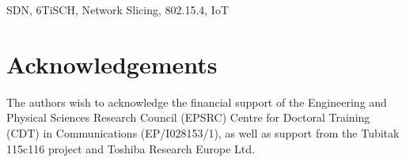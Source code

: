 \documentclass[conference]{IEEEtran}
\begin{document}
\begin{IEEEkeywords}
SDN, 6TiSCH, Network Slicing, 802.15.4, IoT
\end{IEEEkeywords}








\section*{Acknowledgements}

The authors wish to acknowledge the financial support of the Engineering and Physical Sciences Research Council (EPSRC) Centre for Doctoral Training (CDT) in Communications (EP/I028153/1), as well as support from the Tubitak 115c116 project and Toshiba Research Europe Ltd. 






\end{document}
